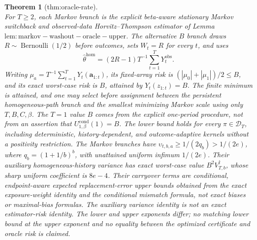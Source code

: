 \documentclass{article}
\newtheorem{theorem}{Theorem}
\begin{document}
\begin{theorem}[thm:oracle-rate]
\[\] For \(T\ge2\), each Markov branch is the explicit beta-aware stationary Markov switchback and observed-data Horvitz--Thompson estimator of Lemma~\(\mathrm{lem:markov-washout-oracle-upper}\). The alternative \(B\) branch draws \(R\sim\operatorname{Bernoulli}(1/2)\) before outcomes, sets \(W_t=R\) for every \(t\), and uses \[\widehat\theta^{\mathrm{hom}}=(2R-1)T^{-1}\sum_{t=1}^T Y_t^{\mathrm{obs}}.\] Writing \(\mu_a=T^{-1}\sum_{t=1}^T Y_t(\mathbf a_{1:t})\), its fixed-array risk is \((|\mu_0|+|\mu_1|)/2\le B\), and its exact worst-case risk is \(B\), attained by \(Y_t(z_{1:t})=B\). The finite minimum is attained, and one may select before assignment between the persistent homogeneous-path branch and the smallest minimizing Markov scale using only \(T,B,C,\beta\). The \(T=1\) value \(B\) comes from the explicit one-period procedure, not from an assertion that \(U_{1,\beta}^{\mathrm{cond}}(1)=B\). The lower bound holds for every \(\pi\in\mathcal D_T\), including deterministic, history-dependent, and outcome-adaptive kernels without a positivity restriction. The Markov branches have \(\upsilon_{t,b,a}\ge1/(2q_b)>1/(2e)\), where \(q_b=(1+1/b)^b\), with unattained uniform infimum \(1/(2e)\). Their auxiliary homogeneous-history variance has exact worst-case value \(B^2V_{T,b}^{\dagger}\), whose sharp uniform coefficient is \(8e-4\). Their carryover terms are conditional, endpoint-aware expected replacement-error upper bounds obtained from the exact exposure-weight identity and the conditional mismatch formula, not exact biases or maximal-bias formulas. The auxiliary variance identity is not an exact estimator-risk identity. The lower and upper exponents differ; no matching lower bound at the upper exponent and no equality between the optimized certificate and oracle risk is claimed.
\end{theorem}
\end{document}
